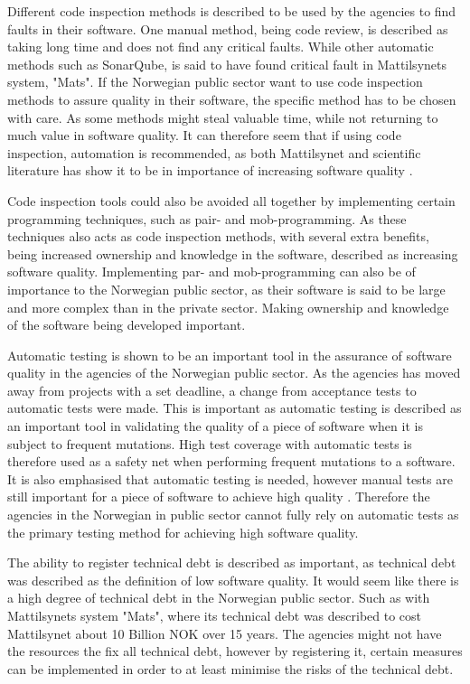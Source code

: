 Different code inspection methods is described to be used by the agencies to find faults in their software. One manual method, being code review, is described as taking long time and does not find any critical faults. While other automatic methods such as SonarQube, is said to have found critical fault in Mattilsynets system, "Mats". If the Norwegian public sector want to use code inspection methods to assure quality in their software, the specific method has to be chosen with care. As some methods might steal valuable time, while not returning to much value in software quality. It can therefore seem that if using code inspection, automation is recommended, as both Mattilsynet and scientific literature has show it to be in importance of increasing software quality \cite{smm_2018}.

Code inspection tools could also be avoided all together by implementing certain programming techniques, such as pair- and mob-programming. As these techniques also acts as code inspection methods, with several extra benefits, being increased ownership and knowledge in the software, described as increasing software quality. Implementing par- and mob-programming can also be of importance to the Norwegian public sector, as their software is said to be large and more complex than in the private sector. Making ownership and knowledge of the software being developed important.

Automatic testing is shown to be an important tool in the assurance of software quality in the agencies of the Norwegian public sector. As the agencies has moved away from projects with a set deadline, a change from acceptance tests to automatic tests were made. This is important as automatic testing is described as an important tool in validating the quality of a piece of software when it is subject to frequent mutations. High test coverage with automatic tests is therefore used as a safety net when performing frequent mutations to a software. It is also emphasised that automatic testing is needed, however manual tests are still important for a piece of software to achieve high quality \cite{dsc_2019}. Therefore the agencies in the Norwegian in public sector cannot fully rely on automatic tests as the primary testing method for achieving high software quality.

The ability to register technical debt is described as important, as technical debt was described as the definition of low software quality. It would seem like there is a high degree of technical debt in the Norwegian public sector. Such as with Mattilsynets system "Mats", where its technical debt was described to cost Mattilsynet about 10 Billion NOK over 15 years. The agencies might not have the resources the fix all technical debt, however by registering it, certain measures can be implemented in order to at least minimise the risks of the technical debt.

